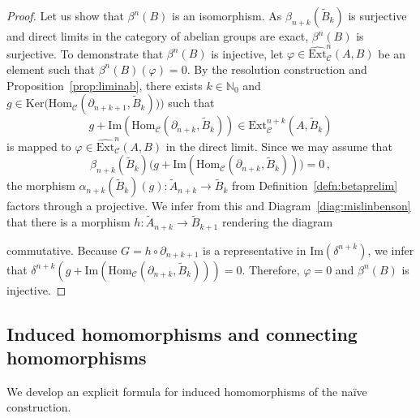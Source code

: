 \documentclass[12pt,a4paper]{article}
\numberwithin{equation}{section}
\theoremstyle{nonumberplain}
\newtheorem{proof}{Proof}
\begin{document}
\begin{proof}
Let us show that $\beta^{n}(B)$ is an isomorphism. As $\beta_{n+k}(\widetilde{B}_k)$ is surjective and direct limits in the category of abelian groups are exact, $\beta^n(B)$ is surjective. To demonstrate that $\beta^n(B)$ is injective, let $\varphi \in \widehat{\mathrm{Ext}}_{\mathcal{C}}^n(A, B)$ be an element such that $\beta^n(B)(\varphi) = 0$. By the resolution construction and  Proposition~\ref{prop:liminab}, there exists $k \in \mathbb{N}_0$ and $g \in \mathrm{Ker}\big(\mathrm{Hom}_{\mathcal{C}}(\partial_{n+k+1}, \widetilde{B}_k))\big)$ such that
\[ g + \mathrm{Im}(\mathrm{Hom}_{\mathcal{C}}(\partial_{n+k}, \widetilde{B}_k)) \in \mathrm{Ext}_{\mathcal{C}}^{n+k}(A, \widetilde{B}_k) \]
is mapped to $\varphi \in \widehat{\mathrm{Ext}}_{\mathcal{C}}^n(A, B)$ in the direct limit. Since we may assume that
\[ \beta_{n+k}(\widetilde{B}_k)\big(g + \mathrm{Im}(\mathrm{Hom}_{\mathcal{C}}(\partial_{n+k}, \widetilde{B}_k))\big) = 0 \, , \]
the morphism $\alpha_{n+k}(\widetilde{B}_k)(g): \widetilde{A}_{n+k} \rightarrow \widetilde{B}_k$ from Definition~\ref{defn:betaprelim} factors through a projective. We infer from this and Diagram~\ref{diag:mislinbenson} that there is a morphism $h: \widetilde{A}_{n+k} \rightarrow \widetilde{B}_{k+1}$ rendering the diagram
\begin{center}
\end{center}
commutative. Because $G = h \circ \partial_{n+k+1}$ is a representative in $\mathrm{Im}(\delta^{n+k})$, we infer that $\delta^{n+k}(g + \mathrm{Im}(\mathrm{Hom}_{\mathcal{C}}(\partial_{n+k}, \widetilde{B}_k))) = 0$. Therefore, $\varphi = 0$ and $\beta^n(B)$ is injective.
\end{proof}

\subsection{Induced homomorphisms and connecting homomorphisms}

We develop an explicit formula for induced homomorphisms of the naïve construction.
\end{document}
